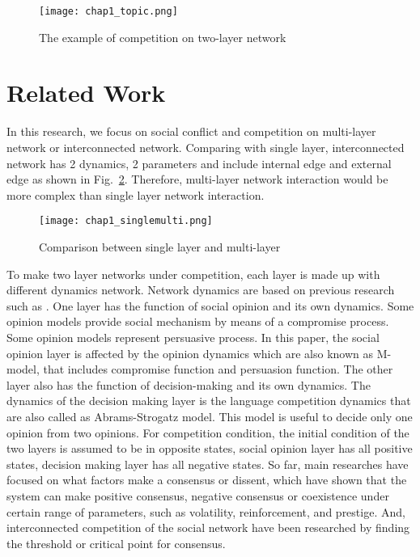 \begin{figure}[!htb]
	\centering
	\texttt{[image: chap1\_topic.png]}
	\caption{The example of competition on two-layer network}
	\label{chap1_topic}
\end{figure}

\section{Related Work}
In this research, we focus on social conflict and competition on multi-layer network or interconnected network. Comparing with single layer, interconnected network has 2 dynamics, 2 parameters and include internal edge and external edge as shown in Fig.~\ref{chap1_singlemulti}. Therefore, multi-layer network interaction would be more complex than single layer network interaction.
\begin{figure}[!htb]
	\centering
	\texttt{[image: chap1\_singlemulti.png]}
	\caption{Comparison between single layer and multi-layer}
	\label{chap1_singlemulti}
\end{figure}
To make two layer networks under competition, each layer is made up with different dynamics network. Network dynamics are based on previous research such as \parencite{alvarez2016}. One layer has the function of social opinion and its own dynamics. Some opinion models provide social mechanism by means of a compromise process.\parencite{naim2003} Some opinion models represent persuasive process.\parencite{chau2014} In this paper, the social opinion layer is affected by the opinion dynamics which are also known as M-model\parencite{rocca2014}, that includes compromise function and persuasion function. The other layer also has the function of decision-making and its own dynamics. The dynamics of the decision making layer is the language competition dynamics that are also called as Abrams-Strogatz model\parencite{abrams2003, vazquez2010, patriarca2012}. This model is useful to decide only one opinion from two opinions. For competition condition, the initial condition of the two layers is assumed to be in opposite states, social opinion layer has all positive states, decision making layer has all negative states.
So far, main researches have focused on what factors make a consensus or dissent, which have shown that the system can make positive consensus, negative consensus or coexistence under certain range of parameters, such as volatility, reinforcement, and prestige.\parencite{alvarez2016} And, interconnected competition of the social network have been researched by finding the threshold or critical point for consensus.\parencite{alvarez2016, gomez2015, diep2017}
